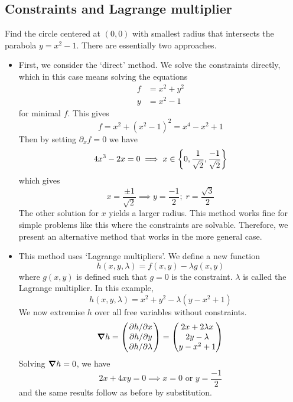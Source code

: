 \subsection{Constraints and Lagrange multiplier}
\begin{example}
	Find the circle centered at \((0, 0)\) with smallest radius that intersects the parabola \(y = x^2 - 1\).
	There are essentially two approaches.
	\begin{itemize}
		\item First, we consider the `direct' method.
		      We solve the constraints directly, which in this case means solving the equations
		      \begin{align*}
			      f & = x^2 + y^2 \\
			      y & = x^2 - 1
		      \end{align*}
		      for minimal \(f\).
		      This gives
		      \[
			      f = x^2 + (x^2 - 1)^2 = x^4 - x^2 + 1
		      \]
		      Then by setting \(\partial_x f = 0\) we have
		      \[
			      4x^3 - 2x = 0 \implies x \in \qty{0, \frac{1}{\sqrt 2}, \frac{-1}{\sqrt 2}}
		      \]
		      which gives
		      \[
			      x = \frac{\pm 1}{\sqrt{2}} \implies y = \frac{-1}{2};\; r = \frac{\sqrt{3}}{2}
		      \]
		      The other solution for \(x\) yields a larger radius.
		      This method works fine for simple problems like this where the constraints are solvable.
		      Therefore, we present an alternative method that works in the more general case.
		\item This method uses `Lagrange multipliers'.
		      We define a new function
		      \[
			      h(x, y, \lambda) = f(x, y) - \lambda g(x, y)
		      \]
		      where \(g(x, y)\) is defined such that \(g = 0\) is the constraint.
		      \(\lambda\) is called the Lagrange multiplier.
		      In this example,
		      \[
			      h(x, y, \lambda) = x^2 + y^2 - \lambda (y - x^2 + 1)
		      \]
		      We now extremise \(h\) over all free variables without constraints.
		      \[
			      \grad{h} = \begin{pmatrix}
				      \pdv*{h}{x} \\ \pdv*{h}{y} \\ \pdv*{h}{\lambda}
			      \end{pmatrix} = \begin{pmatrix}
				      2x + 2\lambda x \\
				      2y - \lambda    \\
				      y - x^2 + 1
			      \end{pmatrix}
		      \]
		      Solving \(\grad{h} = 0\), we have
		      \[
			      2x + 4xy = 0 \implies x = 0 \text{ or } y = \frac{-1}{2}
		      \]
		      and the same results follow as before by substitution.
	\end{itemize}
\end{example}

